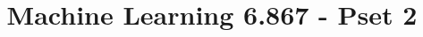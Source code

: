 \documentclass[twoside,11pt]{article}
\begin{document}
\newtheorem{thm1}{Theorem}
\newtheorem{def1}{Definition}


\title{Machine Learning 6.867 - Pset 2}

\maketitle



\end{document}
